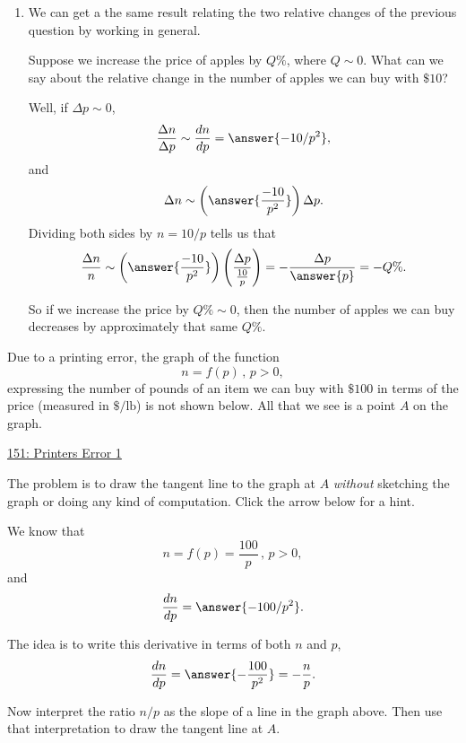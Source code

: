 \documentclass{ximera}
\begin{document}
\begin{question}
\begin{enumerate}
\item We can get a the same result relating the two relative changes of the previous question by working in general. 

Suppose we increase the price of apples by $Q\%$, where $Q\sim 0$. What can we say about the relative change in the number of apples we can buy with $\$10$?

Well, if $\Delta p \sim 0$,
\[
    \frac{\Delta n}{\Delta p}   \sim  \frac{dn}{dp} = \answer{-10/p^2},
\]
and
\[
     \Delta n \sim \left( \answer{\frac{-10}{p^2}} \right) \Delta p.
\]
Dividing both sides by $n = 10/p$ tells us that
\[
        \frac{\Delta n}{n} \sim \left( \answer{\frac{-10}{p^2}} \right)\left( \frac{\Delta p}{\frac{10}{p}} \right) = -\frac{\Delta p}{\answer{p}} = -Q\%.
\]

So if we increase the price by $Q\%\sim 0$, then the number of apples we can buy decreases by approximately that same $Q\%$.

\end{enumerate}

\end{question}

\begin{question} \label{QGETGG3fg44}
Due to a printing error, the graph of the function
\[
      n = f(p)  \, , \, p>0 ,
\]
expressing the number of pounds of an item we can buy with $\$100$ in terms of the price (measured in $\$/\text{lb}$) is not shown below. All that we see is a point $A$ on the graph.

\begin{onlineOnly}
    \begin{center}
\end{center}
\end{onlineOnly}

\href{https://www.desmos.com/calculator/wlr2dignce}{151: Printers Error 1}

The problem is to draw the tangent line to the graph at $A$ \emph{without} sketching the graph or doing any kind of computation. Click the arrow below for a hint.

\begin{expandable}
We know that
\[
      n = f(p)  = \frac{100}{p} \, , \, p>0 ,
\]
and
\[
 \frac{dn}{dp} =\answer{-100/p^2} .
\]

The idea is to write this derivative in terms of both $n$ and $p$, 
\[
   \frac{dn}{dp} =\answer{-\frac{100}{p^2}} = -\frac{n}{p} .
\]

Now interpret the ratio $n/p$ as the slope of a line in the graph above. Then use that interpretation to draw the tangent line at $A$.

\end{expandable}

\end{question}
\end{document}
